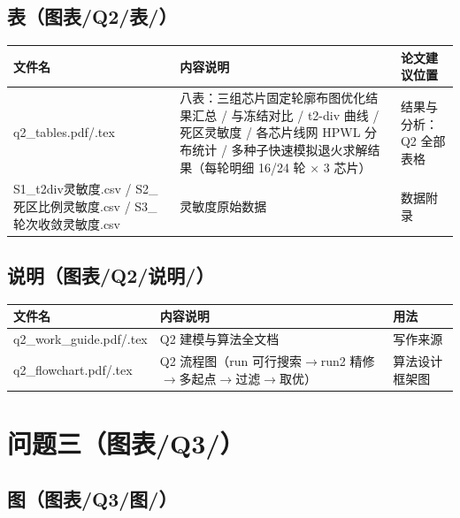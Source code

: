 \documentclass[12pt,a4paper]{article}
\begin{document}
\subsection{表（图表/Q2/表/）}

\begin{table}[H]
\centering
\scriptsize
\setlength{\tabcolsep}{1.5pt}
\begin{tabular}{>{\raggedright\arraybackslash}p{4.4cm}>{\raggedright\arraybackslash}p{7.6cm}>{\raggedright\arraybackslash}p{3.4cm}}
\toprule
文件名 & 内容说明 & 论文建议位置 \\
\midrule
q2\_\allowbreak{}tables.pdf/.tex & 八表：三组芯片固定轮廓布图优化结果汇总 / 与冻结对比 / t2-div 曲线 / 死区灵敏度 / 各芯片线网 HPWL 分布统计 / 多种子快速模拟退火求解结果（每轮明细 16/24 轮 × 3 芯片） & 结果与分析：Q2 全部表格 \\
S1\_\allowbreak{}t2div灵敏度.csv / S2\_\allowbreak{}死区比例灵敏度.csv / S3\_\allowbreak{}轮次收敛灵敏度.csv & 灵敏度原始数据 & 数据附录 \\
\bottomrule
\end{tabular}
\end{table}

\subsection{说明（图表/Q2/说明/）}

\begin{table}[H]
\centering
\scriptsize
\setlength{\tabcolsep}{1.5pt}
\begin{tabular}{>{\raggedright\arraybackslash}p{4.4cm}>{\raggedright\arraybackslash}p{7.6cm}>{\raggedright\arraybackslash}p{3.4cm}}
\toprule
文件名 & 内容说明 & 用法 \\
\midrule
q2\_\allowbreak{}work\_\allowbreak{}guide.pdf/.tex & Q2 建模与算法全文档 & 写作来源 \\
q2\_\allowbreak{}flowchart.pdf/.tex & Q2 流程图（run 可行搜索$\to$run2 精修$\to$多起点$\to$过滤$\to$取优） & 算法设计框架图 \\
\bottomrule
\end{tabular}
\end{table}

\section{问题三（图表/Q3/）}

\subsection{图（图表/Q3/图/）}
\end{document}
